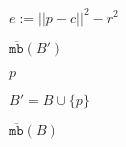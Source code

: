\documentclass{article}
\begin{document}
$ e := ||p - c||^2 - r^2$
\pagebreak

$\overline{\texttt{mb}}(B')$
\pagebreak

$p$
\pagebreak

$B' = B \cup \{p\}$
\pagebreak

$\overline{\texttt{mb}}(B)$
\pagebreak
\end{document}
